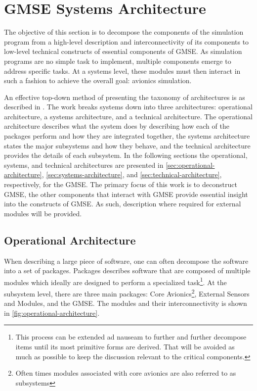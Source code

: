 \section{GMSE Systems Architecture}

The objective of this section is to decompose the components of the simulation program from a
high-level description and interconnectivity of its components to low-level technical constructs of
essential components of GMSE. As simulation programs are no simple task to implement, multiple
components emerge to address specific tasks. At a systems level, these modules must then interact in
such a fashion to achieve the overall goal: avionics simulation.

An effective top-down method of presenting the taxonomy of architectures is as described in
\cite{levis_c4isr_2000}. The work breaks systems down into three architectures: operational
architecture, a systems architecture, and a technical architecture. The operational architecture
describes what the system does by describing how each of the packages perform and how they are
integrated together, the systems architecture states the major subsystems and how they behave, and
the technical architecture provides the details of each subsystem. In the following sections the
operational, systems, and technical architectures are presented in
\autoref{sec:operational-architecture}, \autoref{sec:systems-architecture}, and
\autoref{sec:technical-architecture}, respectively, for the GMSE. The primary focus of this work is
to deconstruct GMSE, the other components that interact with GMSE provide essential insight into the
constructs of GMSE. As such, description where required for external modules will be provided.

\subsection{Operational Architecture}
\label{sec:operational-architecture}

When describing a large piece of software, one can often decompose the software into a set of
packages. Packages describes software that are composed of multiple modules which ideally are
designed to perform a specialized task\footnote{This process can be extended ad nauseam to further
and further decompose items until its most primitive forms are derived. That will be avoided as much
as possible to keep the discussion relevant to the critical components.}. At the subsystem level,
there are three main packages: Core Avionics\footnote{Often times modules associated with core
avionics are also referred to as subsystems}, External Sensors and Modules, and the GMSE. The
modules and their interconnectivity is shown in \autoref{fig:operational-architecture}.

